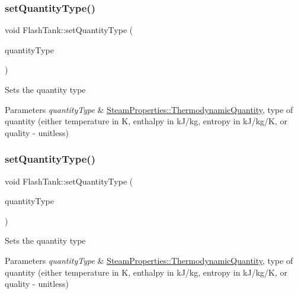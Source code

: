 \subsubsection{\texorpdfstring{set\+Quantity\+Type()}{setQuantityType()}\hspace{0.1cm}{\footnotesize\ttfamily [1/3]}}
{\footnotesize\ttfamily void Flash\+Tank\+::set\+Quantity\+Type (\begin{DoxyParamCaption}\item[{\hyperlink{class_steam_properties_ae0294bedf7d178c2d8fb6aed0f62fbff}{Steam\+Properties\+::\+Thermodynamic\+Quantity}}]{quantity\+Type }\end{DoxyParamCaption})}

Sets the quantity type 
\begin{DoxyParams}{Parameters}
{\em quantity\+Type} & \hyperlink{class_steam_properties_ae0294bedf7d178c2d8fb6aed0f62fbff}{Steam\+Properties\+::\+Thermodynamic\+Quantity}, type of quantity (either temperature in K, enthalpy in k\+J/kg, entropy in k\+J/kg/K, or quality -\/ unitless) \\
\hline
\end{DoxyParams}
\mbox{\label{class_flash_tank_a30aa7a42d1547f61b176da4a15e8e8ee}} 
\subsubsection{\texorpdfstring{set\+Quantity\+Type()}{setQuantityType()}\hspace{0.1cm}{\footnotesize\ttfamily [2/3]}}
{\footnotesize\ttfamily void Flash\+Tank\+::set\+Quantity\+Type (\begin{DoxyParamCaption}\item[{\hyperlink{class_steam_properties_ae0294bedf7d178c2d8fb6aed0f62fbff}{Steam\+Properties\+::\+Thermodynamic\+Quantity}}]{quantity\+Type }\end{DoxyParamCaption})}

Sets the quantity type 
\begin{DoxyParams}{Parameters}
{\em quantity\+Type} & \hyperlink{class_steam_properties_ae0294bedf7d178c2d8fb6aed0f62fbff}{Steam\+Properties\+::\+Thermodynamic\+Quantity}, type of quantity (either temperature in K, enthalpy in k\+J/kg, entropy in k\+J/kg/K, or quality -\/ unitless) \\
\hline
\end{DoxyParams}
\mbox{\label{class_flash_tank_a30aa7a42d1547f61b176da4a15e8e8ee}} 
